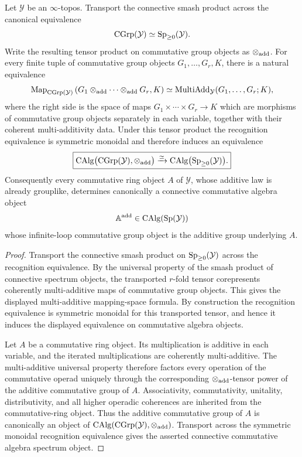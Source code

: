 \begin{lemma}
\label{lem:additive-stabilization-bilinear}
Let \(\mathcal Y\) be an \(\infty\)-topos.  Transport the connective smash product across the
canonical equivalence
\[
    \operatorname{CGrp}(\mathcal Y)
    \simeq
    \mathrm{Sp}_{\geq0}(\mathcal Y).
\]
Write the resulting tensor product on commutative group objects as \(\otimes_{\mathrm{add}}\).  For every
finite tuple of commutative group objects \(G_1,\ldots,G_r,K\), there is a natural equivalence
\[
    \operatorname{Map}_{\operatorname{CGrp}(\mathcal Y)}
    \left(
        G_1\otimes_{\mathrm{add}}\cdots\otimes_{\mathrm{add}}G_r,
        K
    \right)
    \simeq
    \operatorname{MultiAdd}_{\mathcal Y}(G_1,\ldots,G_r;K),
\]
where the right side is the space of maps
\(G_1\times\cdots\times G_r\to K\) which are morphisms of commutative group objects separately in
each variable, together with their coherent multi-additivity data.  Under this tensor product the
recognition equivalence is symmetric monoidal and therefore induces an equivalence
\[
\boxed{
    \operatorname{CAlg}\bigl(\operatorname{CGrp}(\mathcal Y),\otimes_{\mathrm{add}}\bigr)
    \xrightarrow{\simeq}
    \operatorname{CAlg}\bigl(\mathrm{Sp}_{\geq0}(\mathcal Y)\bigr).
}
\]
Consequently every commutative ring object \(A\) of \(\mathcal Y\), whose additive law is already
grouplike, determines canonically a connective commutative algebra object
\[
    \mathbb A^{\mathrm{add}}\in\operatorname{CAlg}(\mathrm{Sp}(\mathcal Y))
\]
whose infinite-loop commutative group object is the additive group underlying \(A\).
\end{lemma}

\begin{proof}
Transport the connective smash product on \(\mathrm{Sp}_{\geq0}(\mathcal Y)\) across the recognition
equivalence.  By the universal property of the smash product of connective spectrum objects, the
transported \(r\)-fold tensor corepresents coherently multi-additive maps of commutative group
objects.  This gives the displayed multi-additive mapping-space formula.  By construction the
recognition equivalence is symmetric monoidal for this transported tensor, and hence it induces the
displayed equivalence on commutative algebra objects.

Let \(A\) be a commutative ring object.  Its multiplication is additive in each variable, and the
iterated multiplications are coherently multi-additive.  The multi-additive universal property
therefore factors every operation of the commutative operad uniquely through the corresponding
\(\otimes_{\mathrm{add}}\)-tensor power of the additive commutative group of \(A\).  Associativity,
commutativity, unitality, distributivity, and all higher operadic coherences are inherited from the
commutative-ring object.  Thus the additive commutative group of \(A\) is canonically an object of
\(\operatorname{CAlg}(\operatorname{CGrp}(\mathcal Y),\otimes_{\mathrm{add}})\).  Transport across the symmetric monoidal recognition
equivalence gives the asserted connective commutative algebra spectrum object.
\end{proof}

